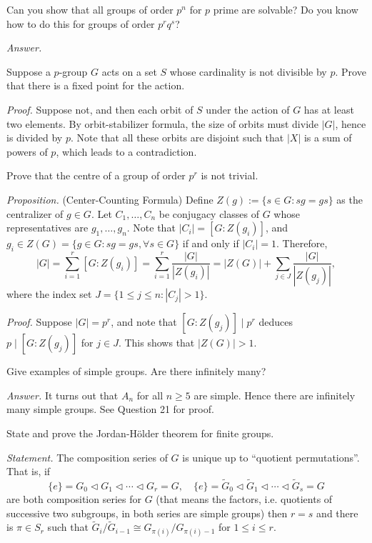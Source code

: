 \documentclass{mathproblems}
\begin{document}
\begin{questions}
\miquestion
{\color{blue} Can you show that all groups of order $p^n$ for $p$ prime are solvable? Do you know how to do this for groups of order $p^rq^s$?}

\textit{Answer.}


\miquestion
{\color{blue} Suppose a $p$-group $G$ acts on a set $S$ whose cardinality is not divisible by $p$. Prove that there is a fixed point for the action.}

\textit{Proof.} Suppose not, and then each orbit of $S$ under the action of $G$ has at least two elements. By orbit-stabilizer formula, the size of orbits must divide $|G|$, hence is divided by $p$. Note that all these orbits are disjoint such that $|X|$ is a sum of powers of $p$, which leads to a contradiction.

\miquestion
{\color{blue} Prove that the centre of a group of order $p^r$ is not trivial.}

{\color{violet}
\textit{Proposition.} (Center-Counting Formula) Define $Z(g):=\{s\in G: sg=gs\}$ as the centralizer of $g\in G$. Let $C_1,\ldots,C_n$ be conjugacy classes of $G$ whose representatives are $g_1,\ldots,g_n$. Note that $|C_i|=[G:Z(g_i)]$, and $g_i\in Z(G)=\{g\in G: sg=gs,\forall s\in G\}$ if and only if $|C_i|=1$. Therefore,
$$
|G|=\sum_{i=1}^{r}[G: Z(g_{i})]=\sum_{i=1}^{r} \frac{|G|}{|Z(g_{i})|}=|Z(G)|+\sum_{j\in J}\frac{|G|}{|Z(g_{j})|},
$$
where the index set $J=\{1\leq j\leq n: |C_j|>1\}$. 
}

\textit{Proof.} Suppose $|G|=p^r$, and note that $[G:Z(g_j)]\mid p^r$ deduces $p\mid [G:Z(g_j)]$ for $j\in J$. This shows that $|Z(G)|>1$.


\miquestion
{\color{blue} Give examples of simple groups. Are there infinitely many?}

\textit{Answer.} It turns out that $A_n$ for all $n\geq 5$ are simple. Hence there are infinitely many simple groups. See Question 21 for proof.

\miquestion
{\color{blue} State and prove the Jordan-H\"older theorem for finite groups.}

\textit{Statement.} The composition series of $G$ is unique up to ``quotient permutations''. That is, if
$$
\{e\}=G_{0} \triangleleft G_{1} \triangleleft \cdots \triangleleft G_{r}=G,\quad \{e\}=\widetilde{G}_{0} \triangleleft \widetilde{G}_{1} \triangleleft \cdots \triangleleft \widetilde{G}_{s}=G
$$
are both composition series for $G$ (that means the factors, i.e. quotients of successive two subgroups, in both series are simple groups) then $r=s$ and there is $\pi \in S_{r}$ such that $\widetilde{G}_{i} / \widetilde{G}_{i-1} \cong G_{\pi(i)} / G_{\pi(i)-1}$ for $1 \leq i \leq r$.


\end{questions}
\end{document}
